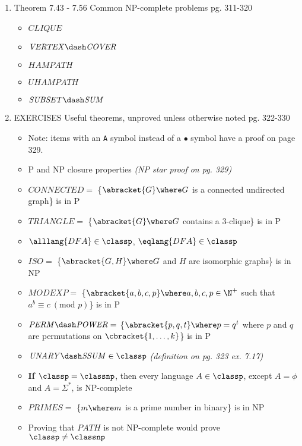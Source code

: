 \documentclass[12pt]{article} %
\newcommand{\theoremitem}[3]{\item #1 \quad #2 \dotfill #3}
\newenvironment{theoremlist} {
    \begin{enumerate}[nosep,leftmargin=*,label={}]
} {
    \end{enumerate}
}
\begin{document}
\begin{theoremlist}
    \theoremitem{Theorem 7.43 - 7.56}
    {Common NP-complete problems}
    {pg. 311-320}
    \begin{multicols}{2}
    \begin{itemize}[nosep]
        \item $\mathit{CLIQUE}$
        \item $\mathit{VERTEX\dash COVER}$
        \item $\mathit{HAMPATH}$
        \item $\mathit{UHAMPATH}$
        \item $\mathit{SUBSET\dash SUM}$
    \end{itemize}
    \end{multicols}

    \theoremitem{EXERCISES}
    {Useful theorems, unproved unless otherwise noted}
    {pg. 322-330}
    \begin{itemize}[nosep]
        \item[] Note: items with an \texttt{A} symbol instead of a $\bullet$ symbol have a proof on page 329.
        \item P and NP  closure properties \textit{(NP star proof on pg. 329)}
        \item $\mathit{CONNECTED}=$ \{$\abracket{G} \where G$ is a connected undirected graph\} is in P
        \item $\mathit{TRIANGLE}=$ \{$\abracket{G} \where G$ contains a 3-clique\} is in P
        \item $\alllang{DFA}\in\classp$, $\eqlang{DFA}\in\classp$
        \item $\mathit{ISO}=$ \{$\abracket{G,H} \where G$ and $H$ are isomorphic graphs\} is in NP
        \item $\mathit{MODEXP}=$ \{$\abracket{a,b,c,p} \where a,b,c,p\in\N^+$ such that $a^b\equiv c\ (\text{mod }p)$\} is in P
        \item $\mathit{PERM\dash POWER}=$ \{$\abracket{p,q,t} \where p=q^t$ where $p$ and $q$ are permutations on $\cbracket{1,\dots,k}$\} is in P
        \item $\mathit{UNARY\dash SSUM}\in\classp$ \textit{(definition on pg. 323 ex. 7.17)}
        \item \textbf{If $\classp=\classnp$}, then every language $A\in\classp$, except $A=\phi$ and $A=\Sigma^*$, is NP-complete
        \item $\mathit{PRIMES}=$ \{$m \where m$ is a prime number in binary\} is in NP
        \item Proving that $\mathit{PATH}$ is not NP-complete would prove $\classp\neq\classnp$

\end{itemize}
\end{theoremlist}
\end{document}
